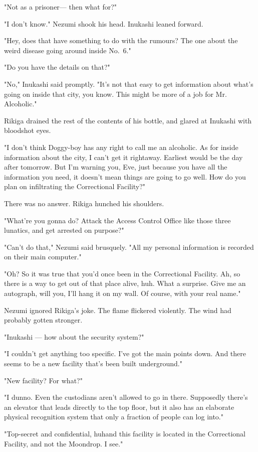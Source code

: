 "Not as a prisoner--- then what for?"

"I don't know." Nezumi shook his head. Inukashi leaned forward.

"Hey, does that have something to do with the rumours? The one about the
weird disease going around inside No.~6."

"Do you have the details on that?"

"No," Inukashi said promptly. "It's not that easy to get information
about what's going on inside that city, you know. This might be more of
a job for Mr. Alcoholic."

Rikiga drained the rest of the contents of his bottle, and glared at
Inukashi with bloodshot eyes.

"I don't think Doggy-boy has any right to call me an alcoholic. As for
inside information about the city, I can't get it rightaway. Earliest
would be the day after tomorrow. But I'm warning you, Eve, just because
you have all the information you need, it doesn't mean things are going
to go well. How do you plan on infiltrating the Correctional Facility?"

There was no answer. Rikiga hunched his shoulders.

"What're you gonna do? Attack the Access Control Office like those three
lunatics, and get arrested on purpose?"

"Can't do that," Nezumi said brusquely. "All my personal information is
recorded on their main computer."

"Oh? So it was true that you'd once been in the Correctional Facility.
Ah, so there is a way to get out of that place alive, huh. What a
surprise. Give me an autograph, will you, I'll hang it on my wall. Of
course, with your real name."

Nezumi ignored Rikiga's joke. The flame flickered violently. The wind
had probably gotten stronger.

"Inukashi --- how about the security system?"

"I couldn't get anything too specific. I've got the main points down.
And there seems to be a new facility that's been built underground."

"New facility? For what?"

"I dunno. Even the custodians aren't allowed to go in there. Supposedly
there's an elevator that leads directly to the top floor, but it also
has an elaborate physical recognition system that only a fraction of
people can log into."

"Top-secret and confidential, huh\el and this facility is located in the
Correctional Facility, and not the Moondrop. I see."

